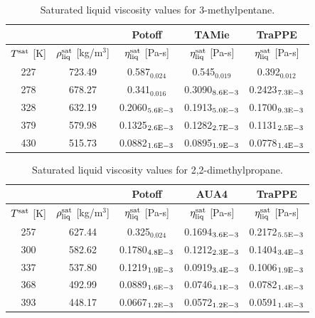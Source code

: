 \documentclass[preprint,review,12pt]{elsarticle}
\begin{document}
	\begin{table}[H]
		\caption{Saturated liquid viscosity values for 3-methylpentane.}
		\begin{center}
			\begin{tabular}{|c|c|c|c|c|}
				\hline
				&                                       & Potoff            & TAMie             & TraPPE            \\ \hline
				$T^{\rm sat}$ {[}K{]} & $\rho^{\rm sat}_{\rm liq}$ [kg/m$^3$] & $\eta_{\rm liq}^{\rm sat}$ {[}Pa-s{]} & $\eta_{\rm liq}^{\rm sat}$ {[}Pa-s{]} & $\eta_{\rm liq}^{\rm sat}$ {[}Pa-s{]} \\ \hline
				227 & 723.49 & 0.587$_{0.024}$   & 0.545$_{0.019}$   & 0.392$_{0.012}$   \\ \hline
				278 & 678.27 & 0.341$_{0.016}$   & 0.3090$_{8.6 \rm E-3}$ & 0.2423$_{7.3 \rm E-3}$ \\ \hline
				328 & 632.19 & 0.2060$_{5.6 \rm E-3}$ & 0.1913$_{5.0 \rm E-3}$ & 0.1700$_{9.3 \rm E-3}$ \\ \hline
				379 & 579.98 & 0.1325$_{2.6 \rm E-3}$ & 0.1282$_{2.7 \rm E-3}$ & 0.1131$_{2.5 \rm E-3}$ \\ \hline
				430 & 515.73 & 0.0882$_{1.6 \rm E-3}$ & 0.0895$_{1.9 \rm E-3}$ & 0.0778$_{1.4 \rm E-3}$ \\ \hline
			\end{tabular}
		\end{center}
	\end{table}
	
	\begin{table}[H]
		\caption{Saturated liquid viscosity values for 2,2-dimethylpropane.}
		\begin{center}
			\begin{tabular}{|c|c|c|c|c|}
				\hline
				&                                       & Potoff            & AUA4             & TraPPE            \\ \hline
				$T^{\rm sat}$ {[}K{]} & $\rho^{\rm sat}_{\rm liq}$ [kg/m$^3$] & $\eta_{\rm liq}^{\rm sat}$ {[}Pa-s{]} & $\eta_{\rm liq}^{\rm sat}$ {[}Pa-s{]} & $\eta_{\rm liq}^{\rm sat}$ {[}Pa-s{]} \\ \hline
				257 & 627.44 & 0.325$_{0.024}$   & 0.1694$_{3.6 \rm E-3}$ & 0.2172$_{5.5 \rm E-3}$ \\ \hline
				300 & 582.62 & 0.1780$_{4.8 \rm E-3}$ & 0.1212$_{2.3 \rm E-3}$ & 0.1404$_{3.4 \rm E-3}$ \\ \hline
				337 & 537.80 & 0.1219$_{1.9 \rm E-3}$ & 0.0919$_{3.4 \rm E-3}$ & 0.1006$_{1.9 \rm E-3}$ \\ \hline
				368 & 492.99 & 0.0889$_{1.6 \rm E-3}$ & 0.0746$_{4.1 \rm E-3}$ & 0.0782$_{1.4 \rm E-3}$ \\ \hline
				393 & 448.17 & 0.0667$_{1.2 \rm E-3}$ & 0.0572$_{1.2 \rm E-3}$ & 0.0591$_{1.4 \rm E-3}$ \\ \hline	
			\end{tabular}
		\end{center}
	\end{table}
	
\end{document}
